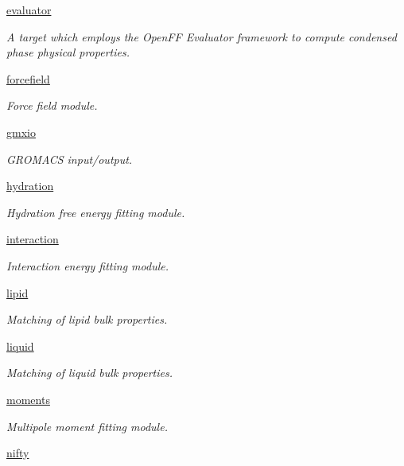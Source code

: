 \begin{DoxyCompactItemize}
 \hyperlink{namespaceforcebalance_1_1evaluator}{evaluator}
\begin{DoxyCompactList}\small\item\em A target which employs the Open\+FF Evaluator framework to compute condensed phase physical properties. \end{DoxyCompactList}\item 
 \hyperlink{namespaceforcebalance_1_1forcefield}{forcefield}
\begin{DoxyCompactList}\small\item\em Force field module. \end{DoxyCompactList}\item 
 \hyperlink{namespaceforcebalance_1_1gmxio}{gmxio}
\begin{DoxyCompactList}\small\item\em G\+R\+O\+M\+A\+CS input/output. \end{DoxyCompactList}\item 
 \hyperlink{namespaceforcebalance_1_1hydration}{hydration}
\begin{DoxyCompactList}\small\item\em Hydration free energy fitting module. \end{DoxyCompactList}\item 
 \hyperlink{namespaceforcebalance_1_1interaction}{interaction}
\begin{DoxyCompactList}\small\item\em Interaction energy fitting module. \end{DoxyCompactList}\item 
 \hyperlink{namespaceforcebalance_1_1lipid}{lipid}
\begin{DoxyCompactList}\small\item\em Matching of lipid bulk properties. \end{DoxyCompactList}\item 
 \hyperlink{namespaceforcebalance_1_1liquid}{liquid}
\begin{DoxyCompactList}\small\item\em Matching of liquid bulk properties. \end{DoxyCompactList}\item 
 \hyperlink{namespaceforcebalance_1_1moments}{moments}
\begin{DoxyCompactList}\small\item\em Multipole moment fitting module. \end{DoxyCompactList}\item 
 \hyperlink{namespaceforcebalance_1_1nifty}{nifty}

\end{DoxyCompactItemize}
